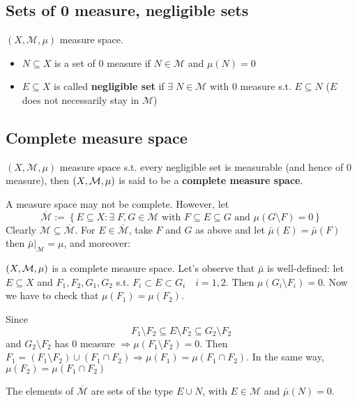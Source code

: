 \subsection{Sets of 0 measure, negligible sets}
\((X, \mathcal{M}, \mu)\) measure space.
\begin{itemize}
    \item \(N \subseteq X\) is a set of \(0\) measure if \(N \in \mathcal{M}\) and \(\mu(N) = 0\)
    \item \(E \subseteq X\) is called \textbf{negligible set} if \(\exists \; N \in \mathcal{M}\) with \(0\) measure s.t. \(E \subseteq N\) (\(E\) does not necessarily stay in \(\mathcal{M}\))
\end{itemize} 
\subsection{Complete measure space}
\begin{definition}
    \((X, \mathcal{M}, \mu)\) measure space s.t. every negligible set is measurable (and hence of \(0\) measure), then \((X, \mathcal{M}, \mu)\) is said to be a \textbf{complete measure space}.

    A measure space may not be complete. However, let 
    \[
        \overline{\mathcal{M}} := \left\lbrace E \subseteq X : \exists\; F, G \in \mathcal{M} \mbox{ with } F\subseteq E \subseteq G \mbox{ and } \mu(G\setminus F) = 0\right\rbrace
    \]
    Clearly \(\mathcal{M} \subseteq \overline{\mathcal{M}}\). For \(E \in \overline{\mathcal{M}}\), take \(F\) and \(G\) as above and let \(\bar{\mu}(E) = \bar{\mu}(F)\) then \(\bar{\mu}\vert_{\mathcal{M}} = \mu\), and moreover:
\end{definition}
\begin{theorem}
    \((X, \mathcal{M}, \mu)\) is a complete measure space. Let's observe that \(\bar{\mu}\) is well-defined: let \(E \subseteq X\) and \(F_1,F_2, G_1, G_2\) s.t. \(F_i \subset E \subset G_i \quad i = 1,2\). Then \(\mu(G_i\setminus F_i) = 0\). Now we have to check that \(\mu(F_1) = \mu(F_2)\). 

    Since \[
        F_1 \setminus F_2 \subseteq E\setminus F_2 \subseteq G_2 \setminus F_2
    \] 
    and \(G_2 \setminus F_2\) has \(0\) measure \(\Rightarrow \mu(F_1 \setminus F_2) = 0\). Then \(F_1 = (F_1 \setminus F_2) \cup (F_1 \cap F_2) \Rightarrow \mu(F_1) = \mu(F_1 \cap F_2).\) In the same way, \(\mu(F_2) = \mu(F_1 \cap F_2)\)
\end{theorem}
The elements of \(\overline{\mathcal{M}}\) are sets of the type \(E \cup N\), with \(E \in \mathcal{M}\) and \(\bar{\mu}(N) = 0\).
